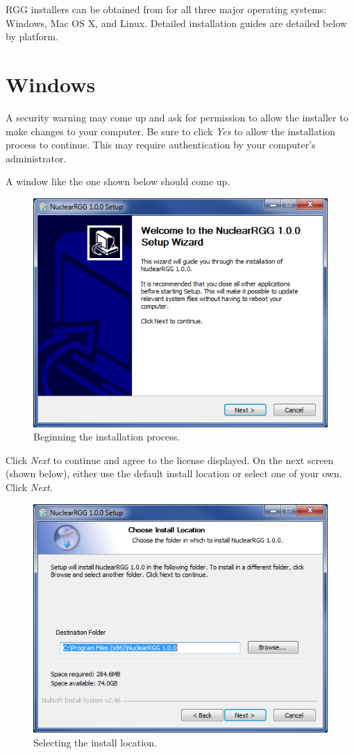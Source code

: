 RGG installers can be obtained from  for all three major operating systems: Windows, Mac OS X, and Linux.  Detailed installation guides are detailed below by platform.

\section{Windows}
A security warning may come up and ask for permission to allow the installer to make changes to your computer.  Be sure to click \emph{Yes} to allow the installation process to continue.  This may require authentication by your computer's administrator.

A window like the one shown below should come up.

\begin{figure}[H]
	\begin{center}
		\includegraphics[width=0.5\linewidth]{Images/windows-install-1.png}
		\caption{Beginning the installation process.}
		\label{fig:WindowsInstall1}
	\end{center}
\end{figure}

Click \emph{Next} to continue and agree to the license displayed.  On the next screen (shown below), either use the default install location or select one of your own.  Click \emph{Next}.

\begin{figure}[H]
	\begin{center}
		\includegraphics[width=0.5\linewidth]{Images/windows-install-2.png}
		\caption{Selecting the install location.}
		\label{fig:WindowsInstall2}
	\end{center}
\end{figure}

